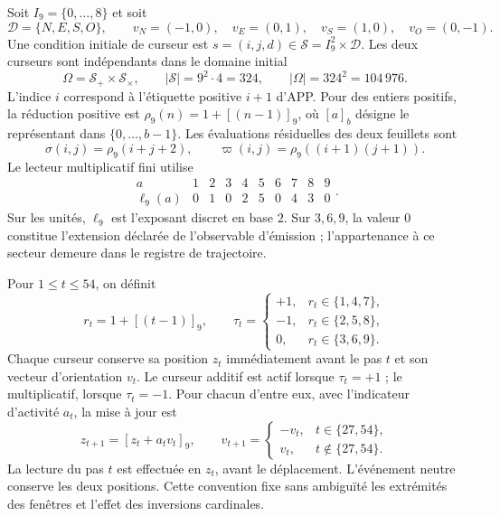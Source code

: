 Soit $I_9=\{0,\ldots,8\}$ et soit
\[
 \mathcal D=\{N,E,S,O\},\qquad
 v_N=(-1,0),\quad v_E=(0,1),\quad
 v_S=(1,0),\quad v_O=(0,-1).
\]
Une condition initiale de curseur est $s=(i,j,d)\in
\mathcal S=I_9^2\times\mathcal D$. Les deux curseurs sont indépendants
dans le domaine initial
\begin{equation}
 \Omega=\mathcal S_+\times\mathcal S_\times,
 \qquad |\mathcal S|=9^2\cdot4=324,
 \qquad |\Omega|=324^2=104\,976.
 \label{iii:iii:nf-dominio}
\end{equation}
L’indice $i$ correspond à l’étiquette positive $i+1$ d’APP. Pour
des entiers positifs, la réduction positive est $\rho_9(n)=1+[(n-1)]_9$,
où $[a]_b$ désigne le représentant dans $\{0,\ldots,b-1\}$.
Les évaluations résiduelles des deux feuillets sont
\[
 \sigma(i,j)=\rho_9(i+j+2),\qquad
 \varpi(i,j)=\rho_9((i+1)(j+1)).
\]
Le lecteur multiplicatif fini utilise
\begin{equation}
 \begin{array}{c|rrrrrrrrr}
 a&1&2&3&4&5&6&7&8&9\\ \hline
 \ell_9(a)&0&1&0&2&5&0&4&3&0
 \end{array}.
 \label{iii:iii:nf-log}
\end{equation}
Sur les unités, $\ell_9$ est l’exposant discret en base $2$.
Sur $3,6,9$, la valeur $0$ constitue l’extension déclarée de
l’observable d’émission ; l’appartenance à ce secteur demeure dans le
registre de trajectoire.

Pour $1\le t\le54$, on définit
\[
 r_t=1+[(t-1)]_9,
 \qquad
 \tau_t=
 \begin{cases}
 +1,&r_t\in\{1,4,7\},\\
 -1,&r_t\in\{2,5,8\},\\
 0,&r_t\in\{3,6,9\}.
 \end{cases}
\]
Chaque curseur conserve sa position $z_t$ immédiatement avant le pas
$t$ et son vecteur d’orientation $v_t$. Le curseur additif est actif
lorsque $\tau_t=+1$ ; le multiplicatif, lorsque $\tau_t=-1$. Pour chacun
d’entre eux, avec l’indicateur d’activité $a_t$, la mise à jour est
\begin{equation}
 z_{t+1}=[z_t+a_tv_t]_9,
 \qquad
 v_{t+1}=
 \begin{cases}
 -v_t,&t\in\{27,54\},\\
 v_t,&t\notin\{27,54\}.
 \end{cases}
 \label{iii:iii:nf-actualizacion}
\end{equation}
La lecture du pas $t$ est effectuée en $z_t$, avant le déplacement.
L’événement neutre conserve les deux positions. Cette convention fixe
sans ambiguïté les extrémités des fenêtres et l’effet des
inversions cardinales.

